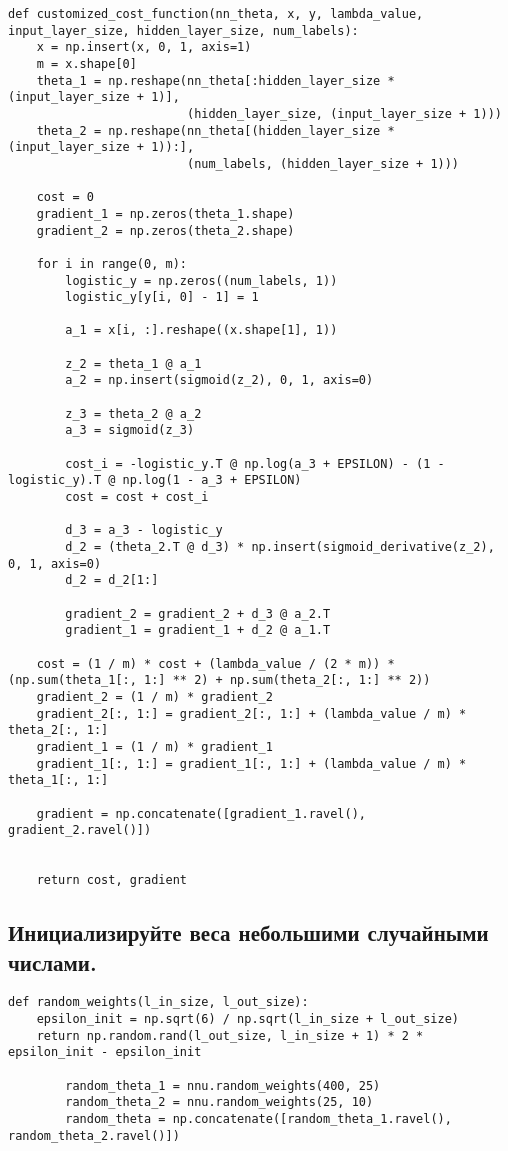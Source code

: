 \begin{lstlisting}
def customized_cost_function(nn_theta, x, y, lambda_value, input_layer_size, hidden_layer_size, num_labels):
    x = np.insert(x, 0, 1, axis=1)
    m = x.shape[0]
    theta_1 = np.reshape(nn_theta[:hidden_layer_size * (input_layer_size + 1)],
                         (hidden_layer_size, (input_layer_size + 1)))
    theta_2 = np.reshape(nn_theta[(hidden_layer_size * (input_layer_size + 1)):],
                         (num_labels, (hidden_layer_size + 1)))

    cost = 0
    gradient_1 = np.zeros(theta_1.shape)
    gradient_2 = np.zeros(theta_2.shape)

    for i in range(0, m):
        logistic_y = np.zeros((num_labels, 1))
        logistic_y[y[i, 0] - 1] = 1

        a_1 = x[i, :].reshape((x.shape[1], 1))

        z_2 = theta_1 @ a_1
        a_2 = np.insert(sigmoid(z_2), 0, 1, axis=0)

        z_3 = theta_2 @ a_2
        a_3 = sigmoid(z_3)

        cost_i = -logistic_y.T @ np.log(a_3 + EPSILON) - (1 - logistic_y).T @ np.log(1 - a_3 + EPSILON)
        cost = cost + cost_i

        d_3 = a_3 - logistic_y
        d_2 = (theta_2.T @ d_3) * np.insert(sigmoid_derivative(z_2), 0, 1, axis=0)
        d_2 = d_2[1:]

        gradient_2 = gradient_2 + d_3 @ a_2.T
        gradient_1 = gradient_1 + d_2 @ a_1.T

    cost = (1 / m) * cost + (lambda_value / (2 * m)) * (np.sum(theta_1[:, 1:] ** 2) + np.sum(theta_2[:, 1:] ** 2))
    gradient_2 = (1 / m) * gradient_2
    gradient_2[:, 1:] = gradient_2[:, 1:] + (lambda_value / m) * theta_2[:, 1:]
    gradient_1 = (1 / m) * gradient_1
    gradient_1[:, 1:] = gradient_1[:, 1:] + (lambda_value / m) * theta_1[:, 1:]

    gradient = np.concatenate([gradient_1.ravel(), gradient_2.ravel()])

 
    return cost, gradient
\end{lstlisting}

\subsection{Инициализируйте веса небольшими случайными числами.}

\begin{lstlisting}
def random_weights(l_in_size, l_out_size):
    epsilon_init = np.sqrt(6) / np.sqrt(l_in_size + l_out_size)
    return np.random.rand(l_out_size, l_in_size + 1) * 2 * epsilon_init - epsilon_init

		random_theta_1 = nnu.random_weights(400, 25)
        random_theta_2 = nnu.random_weights(25, 10)
        random_theta = np.concatenate([random_theta_1.ravel(), random_theta_2.ravel()])
\end{lstlisting}


